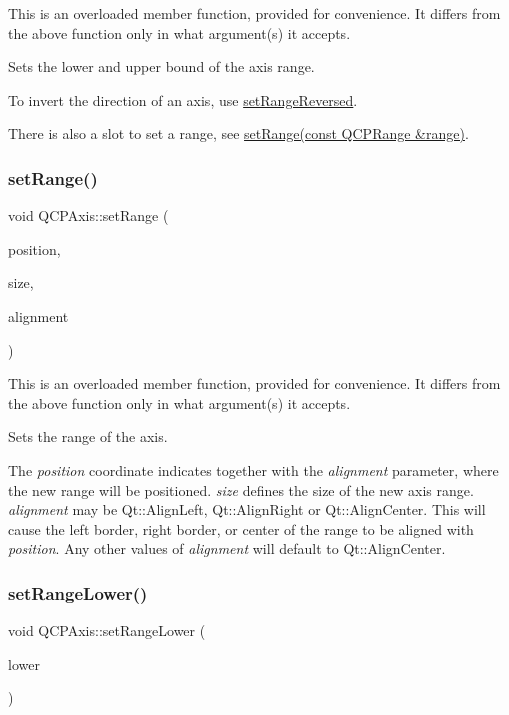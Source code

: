 This is an overloaded member function, provided for convenience. It differs from the above function only in what argument(s) it accepts.

Sets the lower and upper bound of the axis range.

To invert the direction of an axis, use \hyperlink{class_q_c_p_axis_a2172fdb196b1a0dc3f40992fcad8e9e1}{set\+Range\+Reversed}.

There is also a slot to set a range, see \hyperlink{class_q_c_p_axis_aebdfea5d44c3a0ad2b4700cd4d25b641}{set\+Range(const Q\+C\+P\+Range \&range)}. \mbox{\label{class_q_c_p_axis_acf60e5b2d631fbc8c4548c3d579cb6d0}} 
\subsubsection{\texorpdfstring{set\+Range()}{setRange()}\hspace{0.1cm}{\footnotesize\ttfamily [3/3]}}
{\footnotesize\ttfamily void Q\+C\+P\+Axis\+::set\+Range (\begin{DoxyParamCaption}\item[{double}]{position,  }\item[{double}]{size,  }\item[{Qt\+::\+Alignment\+Flag}]{alignment }\end{DoxyParamCaption})}

This is an overloaded member function, provided for convenience. It differs from the above function only in what argument(s) it accepts.

Sets the range of the axis.

The {\itshape position} coordinate indicates together with the {\itshape alignment} parameter, where the new range will be positioned. {\itshape size} defines the size of the new axis range. {\itshape alignment} may be Qt\+::\+Align\+Left, Qt\+::\+Align\+Right or Qt\+::\+Align\+Center. This will cause the left border, right border, or center of the range to be aligned with {\itshape position}. Any other values of {\itshape alignment} will default to Qt\+::\+Align\+Center. \mbox{\label{class_q_c_p_axis_afcf51227d337db28d1a9ce9a4d1bc91a}} 
\subsubsection{\texorpdfstring{set\+Range\+Lower()}{setRangeLower()}}
{\footnotesize\ttfamily void Q\+C\+P\+Axis\+::set\+Range\+Lower (\begin{DoxyParamCaption}\item[{double}]{lower }\end{DoxyParamCaption})}


